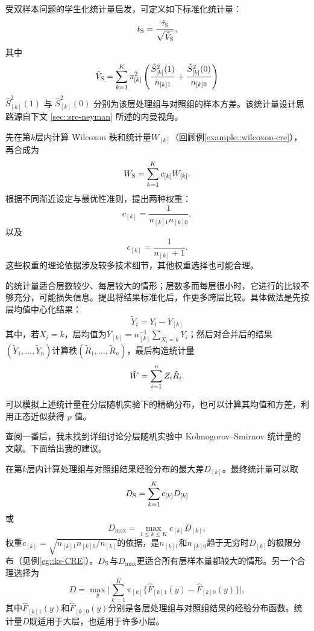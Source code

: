\begin{example}[标准化分层估计量]
\label{eg::student-stratifiedestimator}
受双样本问题的学生化统计量启发，可定义如下标准化统计量：
$$
t_\textsc{S} = 
\frac{ \hat{\tau}_\textsc{S}  }{  \sqrt{\hat{V}_\textsc{S}  }},
$$
其中
$$
\hat{V}_\textsc{S} = \sum_{k=1}^K  \pi_{[k]}^2 \left(  \frac{\hat{S}_{[k]}^2(1)}{ n_{[k]1} } +  \frac{ \hat{S}_{[k]}^2(0)}{ n_{[k]0} } \right)
$$
$\hat{S}_{[k]}^2(1)$ 与 $\hat{S}_{[k]}^2(0)$ 分别为该层处理组与对照组的样本方差。该统计量设计思路源自下文 \ref{sec::sre-neyman} 所述的内曼视角。
\end{example}




\begin{example}[威尔科克森秩和合并法]
\label{eg::vanelteren}
先在第$k$层内计算 Wilcoxon 秩和统计量$W_{[k]}$（回顾例\ref{example::wilcoxon-cre}），再合成为
$$
W_\textsc{S} = \sum_{k=1}^K   c_{[k]}  W_{[k]}   . 
$$
根据不同渐近设定与最优性准则，\citet{van1960combination}提出两种权重：
$$
c_{[k]}  = \frac{1}{  n_{[k]1}  n_{[k]0} },
$$
以及
$$ 
c_{[k]}  = \frac{1}{  n_{[k]}  +1 } .
$$
这些权重的理论依据涉及较多技术细节，其他权重选择也可能合理。 
\end{example}


 


\begin{example}
\label{eg::hodgeslehmann}
\citet{van1960combination}的统计量适合层数较少、每层较大的情形；层数多而每层很小时，它进行的比较不够充分，可能损失信息。\citet{hodges1962rank}提出将结果标准化后，作更多跨层比较。具体做法是先按层均值中心化结果：
$$
\tilde{Y}_i = Y_i  - \bar{Y}_{[k]}
$$
其中，若$X_i = k$，层均值为$
\bar{Y}_{[k]} = n_{[k]}^{-1} \sum_{X_i   = k} Y_i
$；然后对合并后的结果$(\tilde{Y}_1, \ldots, \tilde{Y}_n)$计算秩$(\tilde{R}_1, \ldots, \tilde{R}_n)$，最后构造统计量
$$
\tilde{W} = \sum_{i=1}^n Z_i \tilde{R}_i.
$$
\end{example}


可以模拟上述统计量在分层随机实验下的精确分布，也可以计算其均值和方差，利用正态近似获得 $p$ 值。


查阅一番后，我未找到详细讨论分层随机实验中 Kolmogorov--Smirnov 统计量的文献。下面给出我的建议。


 \begin{example}
\label{eg::ks-stratified}
在第$k$层内计算处理组与对照组结果经验分布的最大差$D_{[k]}$。最终统计量可以取
$$
D_\textsc{S}  = \sum_{k=1}^K    c_{[k]}    D_{[k]}
$$
或
$$
D_{\max} = \max_{1\leq k \leq K}  c_{[k]}   D_{[k]},
$$
权重$ c_{[k]}   = \sqrt{   n_{[k]1}  n_{[k]0} /  n_{[k]}  }$的依据，是$n_{[k]1} $和$ n_{[k]0} $趋于无穷时$D_{[k]}$的极限分布（见例\ref{eg::ks-CRE}）。$D_\textsc{S} $与$D_{\max} $更适合所有层样本量都较大的情形。另一个合理选择为
$$
D =  \max_y \Big |  \sum_{k=1}^K  \pi_{[k]}  \{  \hat{F}_{[k]1}(y)  - \hat{F}_{[k]0}(y) \}   \Big | ,
$$
其中$\hat{F}_{[k]1}(y)  $和$ \hat{F}_{[k]0}(y)$分别是各层处理组与对照组结果的经验分布函数。统计量$D$既适用于大层，也适用于许多小层。 
\end{example}
 
